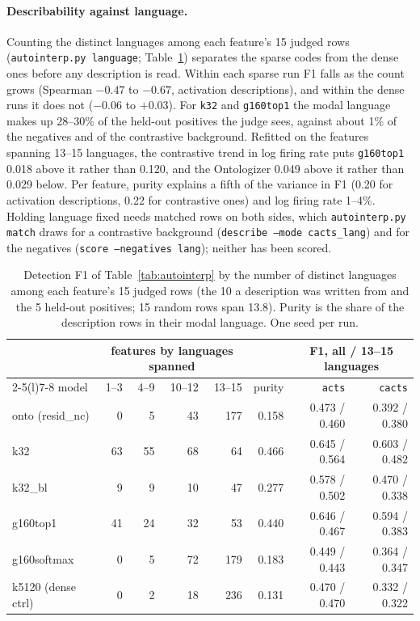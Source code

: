 \paragraph{Describability against language.} Counting the distinct
languages among each feature's 15 judged rows (\texttt{autointerp.py
language}; Table~\ref{tab:autointerp-lang}) separates the sparse codes
from the dense ones before any description is read. Within each sparse
run F1 falls as the count grows (Spearman $-0.47$ to $-0.67$, activation
descriptions), and within the dense runs it does not ($-0.06$ to
$+0.03$). For \texttt{k32} and \texttt{g160top1} the modal language makes
up 28--30\% of the held-out positives the judge sees, against about 1\%
of the negatives and of the contrastive background. Refitted on the
features spanning 13--15 languages, the contrastive trend in log firing
rate puts \texttt{g160top1} 0.018 above it rather than 0.120, and the
Ontologizer 0.049 above it rather than 0.029 below. Per feature, purity
explains a fifth of the variance in F1 (0.20 for activation descriptions,
0.22 for contrastive ones) and log firing rate 1--4\%. Holding language
fixed needs matched rows on both sides, which \texttt{autointerp.py
match} draws for a contrastive background (\texttt{describe --mode
cacts\_lang}) and for the negatives (\texttt{score --negatives lang});
neither has been scored.

\begin{table}[htbp]\centering\small\setlength{\tabcolsep}{4pt}
\begin{tabular}{@{}lrrrrrrr@{}}
\toprule
& \multicolumn{4}{c}{features by languages spanned} & & \multicolumn{2}{c}{F1, all / 13--15 languages} \\
\cmidrule(lr){2-5}\cmidrule(l){7-8}
model & 1--3 & 4--9 & 10--12 & 13--15 & purity & \texttt{acts} & \texttt{cacts} \\
\midrule
onto (resid\_nc)   & 0  & 5  & 43 & 177 & 0.158 & 0.473 / 0.460 & 0.392 / 0.380 \\
k32                & 63 & 55 & 68 & 64  & 0.466 & 0.645 / 0.564 & 0.603 / 0.482 \\
k32\_bl            & 9  & 9  & 10 & 47  & 0.277 & 0.578 / 0.502 & 0.470 / 0.338 \\
g160top1           & 41 & 24 & 32 & 53  & 0.440 & 0.646 / 0.467 & 0.594 / 0.383 \\
g160softmax        & 0  & 5  & 72 & 179 & 0.183 & 0.449 / 0.443 & 0.364 / 0.347 \\
k5120 (dense ctrl) & 0  & 2  & 18 & 236 & 0.131 & 0.470 / 0.470 & 0.332 / 0.322 \\
\bottomrule
\end{tabular}
\caption{Detection F1 of Table~\ref{tab:autointerp} by the number of
distinct languages among each feature's 15 judged rows (the 10 a
description was written from and the 5 held-out positives; 15 random rows
span 13.8). Purity is the share of the description rows in their modal
language. One seed per run.}
\label{tab:autointerp-lang}
\end{table}

